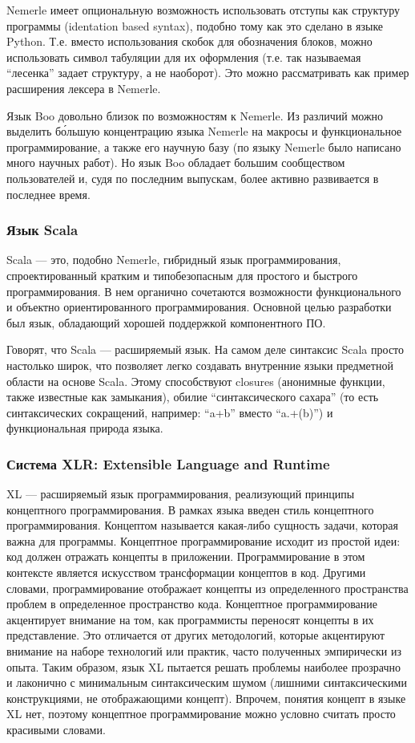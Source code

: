 \documentclass[a4paper,12pt,titlepage]{extarticle}
\begin{document}
Nemerle имеет опциональную возможность использовать отступы как структуру
программы (identation based syntax), подобно тому как это сделано в языке
Python. Т.е. вместо использования скобок для обозначения блоков, можно
использовать символ табуляции для их оформления (т.е. так называемая
``лесенка'' задает структуру, а не наоборот). Это можно рассматривать как
пример расширения лексера в Nemerle.

Язык Boo довольно близок по возможностям к Nemerle. Из различий можно выделить
б\'{о}льшую концентрацию языка Nemerle на макросы и функциональное
программирование, а также его научную базу (по языку Nemerle было написано много
научных работ). Но язык Boo обладает большим сообществом пользователей и, судя
по последним выпускам, более активно развивается в последнее время.

\subsubsection*{Язык Scala}
Scala — это, подобно Nemerle, гибридный язык программирования, спроектированный
кратким и типобезопасным для простого и быстрого программирования. В нем органично
сочетаются возможности функционального и объектно ориентированного
программирования. Основной целью разработки был язык, обладающий хорошей
поддержкой компонентного ПО.

Говорят, что Scala --- расширяемый язык. На самом деле синтаксис Scala просто
настолько широк, что позволяет легко создавать внутренние языки предметной
области на основе Scala. Этому способствуют closures (анонимные функции, также
известные как замыкания), обилие ``синтаксического сахара'' (то есть
синтаксических сокращений, например: ``a+b'' вместо ``a.+(b)'') и
функциональная природа языка.

\subsubsection*{Система XLR: Extensible Language and Runtime}
\label{xlr}
XL --- расширяемый язык программирования, реализующий принципы концептного
программирования. В рамках языка введен стиль концептного программирования.
Концептом называется какая-либо сущность задачи, которая важна для программы.
Концептное программирование исходит из простой идеи: код должен отражать концепты в приложении.
Программирование в этом контексте является искусством трансформации концептов в
код. Другими словами, программирование отображает концепты из определенного
пространства проблем в определенное пространство кода. Концептное
программирование акцентирует внимание на том, как программисты переносят
концепты в их представление. Это отличается от других методологий, которые
акцентируют внимание на наборе технологий или практик, часто полученных
эмпирически из опыта. Таким образом, язык XL пытается решать проблемы наиболее прозрачно и лаконично
с минимальным синтаксическим шумом (лишними синтаксическими конструкциями, не
отображающими концепт). Впрочем, понятия концепт в языке XL нет, поэтому
концептное программирование можно условно считать просто красивыми словами.
\end{document}
